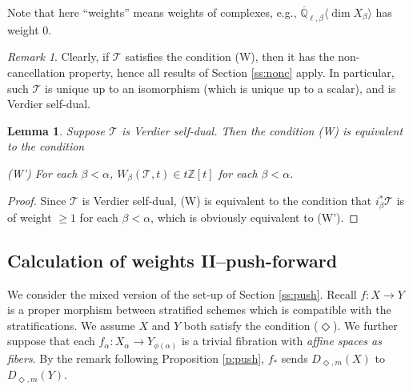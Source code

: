 \documentclass{amsart}
\theoremstyle{plain}
\newtheorem{lemma}[subsubsection]{Lemma}
\theoremstyle{definition}
\theoremstyle{remark}
\newtheorem*{remark}{Remark}
\numberwithin{equation}{subsection}
\begin{document}
Note that here ``weights'' means weights of complexes, e.g., $\overline{\mathbb{Q}}_{\ell,\beta}{\langle{{\dim X_\beta}}\rangle}$ has weight 0.

\begin{remark}
Clearly, if ${\mathcal{T}}$ satisfies the condition (W), then it has the non-cancellation property, hence all results of Section \ref{ss:nonc} apply. In particular, such ${\mathcal{T}}$ is unique up to an isomorphism (which is unique up to a scalar), and is Verdier self-dual.
\end{remark}

\begin{lemma}\label{l:wprime}
Suppose ${\mathcal{T}}$ is Verdier self-dual. Then the condition \textup{(W)} is equivalent to the condition

\textup{(W')} For each $\beta<\alpha$, $W_\beta({\mathcal{T}},t)\in t{\mathbb{Z}}[t]$ for each $\beta<\alpha$.
\end{lemma}
\begin{proof}
Since ${\mathcal{T}}$ is Verdier self-dual, (W) is equivalent to the condition that $i_\beta^*{\mathcal{T}}$ is of weight $\geq1$ for each $\beta<\alpha$, which is obviously equivalent to (W').
\end{proof}

\subsection{Calculation of weights II--push-forward}\label{ss:wpush}
We consider the mixed version of the set-up of Section \ref{ss:push}. Recall $f:X\to Y$ is a proper morphism between stratified schemes which is compatible with the stratifications. We assume $X$ and $Y$ both satisfy the condition ($\Diamond$). We further suppose that each $f_\alpha:X_\alpha\to Y_{\phi(\alpha)}$ is a trivial fibration with {\em affine spaces as fibers}. By the remark following Proposition \ref{p:push}, $f_*$ sends ${D_{\Diamond,m}({X})}$ to ${D_{\Diamond,m}({Y})}$.
\end{document}
